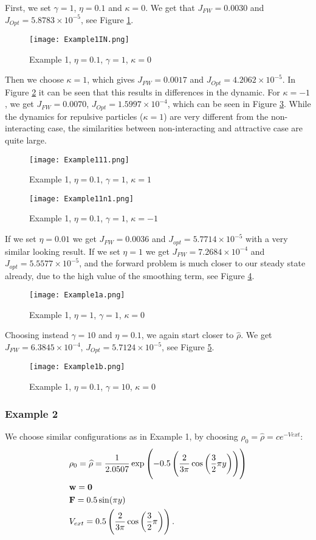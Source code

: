 	First, we set $\gamma = 1$, $\eta = 0.1$ and $\kappa = 0$. We get that $J_{FW} = 0.0030$ and $J_{Opt} = 5.8783 \times 10^{-5}$, see Figure \ref{F1}.
	\begin{figure}[h]
		\centering
		\texttt{[image: Example1IN.png]}
		\caption{Example 1, $\eta = 0.1$, $\gamma = 1$, $\kappa = 0$} 
		\label{F1}
	\end{figure}
    Then we choose $\kappa = 1$, which gives $J_{FW} = 0.0017$ and $J_{Opt} = 4.2062 \times 10^{-5}$. In Figure \ref{F1a} it can be seen that this results in differences in the dynamic. 
    For $\kappa = -1$, we get $J_{FW} = 0.0070$, $J_{Opt} = 1.5997 \times 10^{-4}$, which can be seen in Figure \ref{F1b}. While the dynamics for repulsive particles ($\kappa = 1$) are very different from the non-interacting case, the similarities between non-interacting and attractive case are quite large.
\begin{figure}[h]
	\centering
	\texttt{[image: Example111.png]}
	\caption{Example 1, $\eta = 0.1$, $\gamma = 1$, $\kappa = 1$} 
	\label{F1a}
\end{figure}
\begin{figure}[h]
	\centering
	\texttt{[image: Example11n1.png]}
	\caption{Example 1, $\eta = 0.1$, $\gamma = 1$, $\kappa = -1$} 
	\label{F1b}
\end{figure}
	If we set $\eta = 0.01$ we get $J_{FW} = 0.0036$ and $J_{opt} = 5.7714 \times 10^{-5}$ with a very similar looking result.
	If we set $\eta = 1$ we get $J_{FW} = 7.2684 \times 10^{-4}$ and $J_{opt} = 5.5577 \times 10^{-5}$, and the forward problem is much closer to our steady state already, due to the high value of the smoothing term, see Figure \ref{F2}.
	\begin{figure}[h]
		\centering
		\texttt{[image: Example1a.png]}
		\caption{Example 1, $\eta = 1$, $\gamma = 1$, $\kappa = 0$} 
		\label{F2}
	\end{figure}
	Choosing instead $\gamma = 10$ and $\eta = 0.1$, we again start closer to $\widehat \rho$. We get $J_{FW} = 6.3845 \times 10^{-4}$, $J_{Opt} = 5.7124 \times 10^{-5}$, see Figure \ref{F3}.
	\begin{figure}[h]
		\centering
		\texttt{[image: Example1b.png]}
		\caption{Example 1, $\eta = 0.1$, $\gamma = 10$, $\kappa = 0$} 
		\label{F3}
	\end{figure}
	
	\subsubsection{Example 2}
	We choose similar configurations as in Example 1, by choosing $\rho_0 = \widehat \rho = c e^{-V{ext}}$:
	\begin{align*}
	&\rho_0 = \widehat \rho = \frac{1}{2.0507} \exp\left(-0.5\left(\frac{2}{3 \pi}\cos\left(\frac{3}{2}\pi y\right)\right) \right)\\
	&\mathbf{w} = \mathbf 0 \\
	&\mathbf{F} = 0.5 \sin(\pi y)\\
	&V_{ext} = 0.5 \left(\frac{2}{3 \pi}\cos\left(\frac{3}{2}\pi \right) \right).
	\end{align*}
	
